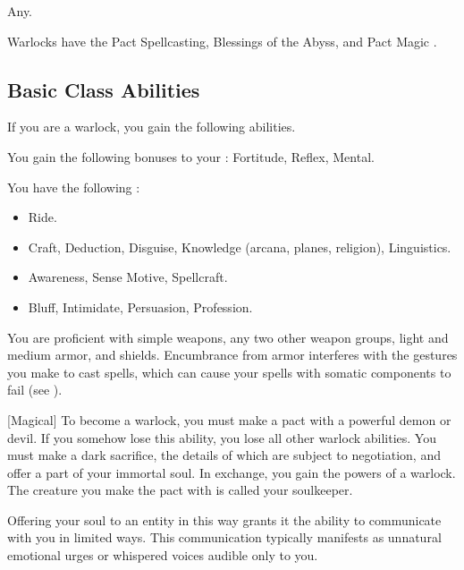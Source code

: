      Any.

     Warlocks have the Pact Spellcasting, Blessings of the Abyss, and Pact Magic .

    \subsection{Basic Class Abilities}
        If you are a warlock, you gain the following abilities.

        You gain the following bonuses to your :  Fortitude,  Reflex,  Mental.

        You have the following :
        \begin{itemize}
            \item {} Ride.
            \item {} Craft, Deduction, Disguise, Knowledge (arcana, planes, religion), Linguistics.
            \item {} Awareness, Sense Motive, Spellcraft.
            \item {} Bluff, Intimidate, Persuasion, Profession.
        \end{itemize}

        You are proficient with simple weapons, any two other weapon groups, light and medium armor, and shields.
        Encumbrance from armor interferes with the gestures you make to cast spells, which can cause your spells with somatic components to fail (see ).

        [Magical]
        To become a warlock, you must make a pact with a powerful demon or devil.
        If you somehow lose this ability, you lose all other warlock abilities.
        You must make a dark sacrifice, the details of which are subject to negotiation, and offer a part of your immortal soul.
        In exchange, you gain the powers of a warlock.
        The creature you make the pact with is called your soulkeeper.

        Offering your soul to an entity in this way grants it the ability to communicate with you in limited ways.
        This communication typically manifests as unnatural emotional urges or whispered voices audible only to you.

